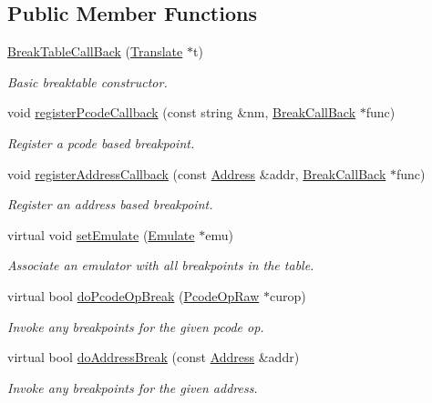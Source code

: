 \subsection*{Public Member Functions}
\begin{DoxyCompactItemize}
\item 
\mbox{\hyperlink{class_break_table_call_back_ada0c6a6ba41fe406768cb37cee7daaa2}{Break\+Table\+Call\+Back}} (\mbox{\hyperlink{class_translate}{Translate}} $\ast$t)
\begin{DoxyCompactList}\small\item\em Basic breaktable constructor. \end{DoxyCompactList}\item 
void \mbox{\hyperlink{class_break_table_call_back_a7c2ea1b2996ea556188e1c09a8f6ec1f}{register\+Pcode\+Callback}} (const string \&nm, \mbox{\hyperlink{class_break_call_back}{Break\+Call\+Back}} $\ast$func)
\begin{DoxyCompactList}\small\item\em Register a pcode based breakpoint. \end{DoxyCompactList}\item 
void \mbox{\hyperlink{class_break_table_call_back_a22f1cb661549be082a71edcca5eb7f5f}{register\+Address\+Callback}} (const \mbox{\hyperlink{class_address}{Address}} \&addr, \mbox{\hyperlink{class_break_call_back}{Break\+Call\+Back}} $\ast$func)
\begin{DoxyCompactList}\small\item\em Register an address based breakpoint. \end{DoxyCompactList}\item 
virtual void \mbox{\hyperlink{class_break_table_call_back_a341d8841e68c7237e1502e2643016abc}{set\+Emulate}} (\mbox{\hyperlink{class_emulate}{Emulate}} $\ast$emu)
\begin{DoxyCompactList}\small\item\em Associate an emulator with all breakpoints in the table. \end{DoxyCompactList}\item 
virtual bool \mbox{\hyperlink{class_break_table_call_back_a16b989de8c0b55d15940ac41bf7cdd73}{do\+Pcode\+Op\+Break}} (\mbox{\hyperlink{class_pcode_op_raw}{Pcode\+Op\+Raw}} $\ast$curop)
\begin{DoxyCompactList}\small\item\em Invoke any breakpoints for the given pcode op. \end{DoxyCompactList}\item 
virtual bool \mbox{\hyperlink{class_break_table_call_back_af2d28bc35a414feed38205b41f387afc}{do\+Address\+Break}} (const \mbox{\hyperlink{class_address}{Address}} \&addr)
\begin{DoxyCompactList}\small\item\em Invoke any breakpoints for the given address. \end{DoxyCompactList}\end{DoxyCompactItemize}


